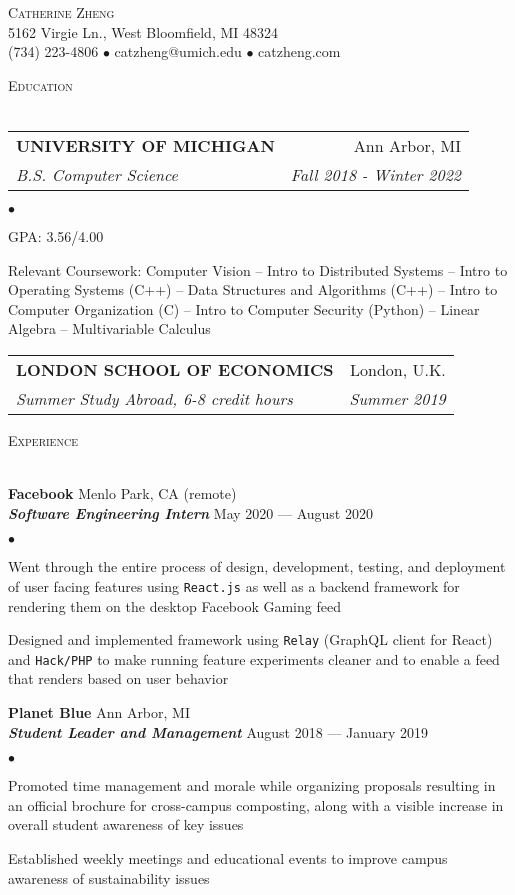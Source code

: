 \documentclass{article}
\makeatletter
\newcommand{\lineunder}{\vspace*{-8pt} \\ \hspace*{-20pt} \hrulefill \\}
\newcommand{\header}[1]{{\hspace*{-20pt}\vspace*{6pt} \large\textsc{#1}} \vspace*{-5pt} \lineunder \vspace{3pt}}
\newcommand{\employer}[4]{{ \normalsize\textbf{#1} \small\hfill{#2}\\ {\small\textbf{\emph{#3}}} \small\hfill{#4}\\ }}
\newcommand{\contact}[3]{
\vspace*{-5pt}
\begin{center}
{\huge \scshape {#1}}\\
\vspace{2pt}
#2\\
#3
\end{center}
\vspace*{-10pt}
}
\newenvironment{achievements}{\begin{list}{$\bullet$}{\topsep 0pt \itemsep 0pt}}{\vspace*{5pt}\end{list}}
\newcommand{\school}[4]{
\begin{tabular*}{6.55in}{l@{\extracolsep{\fill}}r}
	\uppercase{\normalsize\textbf{#1}} & #2 \\
	\textit{#3} & \textit{#4}\\
\end{tabular*}\vspace*{3pt}}
\makeatother
\begin{document}
\small
\smallskip
\vspace*{-40pt}

\contact{Catherine Zheng}
{\small5162 Virgie Ln., West Bloomfield, MI 48324}
{\small(734) 223-4806 $\bullet$ catzheng@umich.edu  $\bullet$ catzheng.com}

\vspace{10pt}
\header{Education}

\vspace{1ex}
\school{University of Michigan}{Ann Arbor, MI}{B.S. Computer Science}{Fall 2018 - Winter 2022}
\begin{achievements}
\item GPA: 3.56/4.00
\item Relevant Coursework: Computer Vision -- Intro to Distributed Systems -- Intro to Operating Systems (C++) -- Data Structures and Algorithms (C++) -- Intro to Computer Organization (C) -- Intro to Computer Security (Python) -- Linear Algebra -- Multivariable Calculus
\end{achievements}
\vspace{1pt}
\school{London School of Economics}{London, U.K.}{Summer Study Abroad, 6-8 credit hours}{Summer 2019}
\vspace{1pt}

\header{Experience}

\employer{Facebook}{Menlo Park, CA (remote)}{Software Engineering Intern}{May 2020 --- August 2020}
	\begin{achievements}
	\item Went through the entire process of design, development, testing, and deployment of user facing features using \texttt{React.js} as well as a backend framework for rendering them on the desktop Facebook Gaming feed
	\item Designed and implemented framework using \texttt{Relay} (GraphQL client for React) and \texttt{Hack/PHP} to make running feature experiments cleaner and to enable a feed that renders based on user behavior
	\end{achievements}

\employer{Planet Blue}{Ann Arbor, MI}{Student Leader and Management}{August 2018 --- January 2019}
	\begin{achievements}
	\item Promoted time management and morale while organizing proposals resulting in an official brochure for cross-campus composting, along with a visible increase in overall student awareness of key issues
	\item Established weekly meetings and educational events to improve campus awareness of sustainability issues
	\end{achievements}
\end{document}
